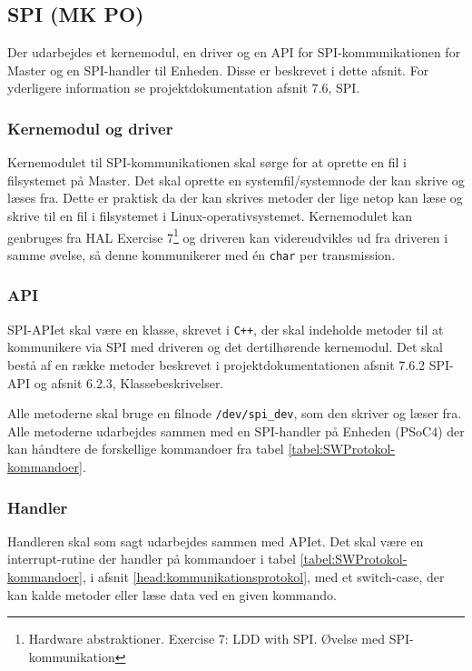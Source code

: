 \subsection{SPI (MK PO)}

Der udarbejdes et kernemodul, en driver og en API for SPI-kommunikationen for Master og en SPI-handler til Enheden. Disse er beskrevet i dette afsnit. For yderligere information se projektdokumentation afsnit 7.6, SPI.

\subsubsection*{Kernemodul og driver}

Kernemodulet til SPI-kommunikationen skal sørge for at oprette en fil i filsystemet på Master. Det skal oprette en systemfil/systemnode der kan skrive og læses fra. Dette er praktisk da der kan skrives metoder der lige netop kan læse og skrive til en fil i filsystemet i Linux-operativsystemet. Kernemodulet kan genbruges fra HAL Exercise 7\footnote{Hardware abstraktioner. Exercise 7: LDD with SPI. Øvelse med SPI-kommunikation} og driveren kan videreudvikles ud fra driveren i samme øvelse, så denne kommunikerer med én \verb+char+ per transmission.

\subsubsection*{API}

SPI-APIet skal være en klasse, skrevet i \verb-C++-, der skal indeholde metoder til at kommunikere via SPI med driveren og det dertilhørende kernemodul. Det skal bestå af en række metoder beskrevet i projektdokumentationen afsnit 7.6.2 SPI-API og afsnit 6.2.3, Klassebeskrivelser. 

Alle metoderne skal bruge en filnode \verb+/dev/spi_dev+, som den skriver og læser fra. Alle metoderne udarbejdes sammen med en SPI-handler på Enheden (PSoC4) der kan håndtere de forskellige kommandoer fra tabel \ref{tabel:SWProtokol-kommandoer}.

\subsubsection*{Handler}

Handleren skal som sagt udarbejdes sammen med APIet. Det skal være en interrupt-rutine der handler på kommandoer i tabel \ref{tabel:SWProtokol-kommandoer}, i afsnit \ref{head:kommunikationsprotokol}, med et switch-case, der kan kalde metoder eller læse data ved en given kommando.
